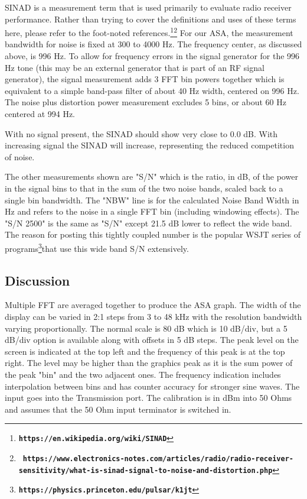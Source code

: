 SINAD is a measurement term that is used primarily to evaluate radio receiver performance.  Rather than trying to cover the definitions and uses of these terms here, please refer to the foot-noted references.\footnote{\textbf{\texttt{https://en.wikipedia.org/wiki/SINAD}}}\footnote{{\scriptsize\ \textbf{\texttt{https://www.electronics-notes.com/articles/radio/radio-receiver-sensitivity/what-is-sinad-signal-to-noise-and-distortion.php}}}}
%
For our ASA, the measurement bandwidth for noise is fixed at 300 to 4000 Hz.  The frequency center, as discussed above, is 996 Hz.  To allow for frequency errors in the signal generator for the 996 Hz tone (this may be an external generator that is part of an RF signal generator), the signal measurement adds 3 FFT bin powers together which is equivalent to a simple band-pass filter of about 40 Hz width, centered on 996 Hz.  The noise plus distortion power measurement excludes 5 bins, or about 60 Hz centered at 994 Hz.

With no signal present, the SINAD should show very close to 0.0 dB.  With increasing signal the SINAD will increase, representing the reduced competition of noise.

The other measurements shown are "\textsf{S/N}" which is the ratio, in dB, of the power in the signal bins to that in the sum of the two noise bands, scaled back to a single bin bandwidth.   The "\textsf{NBW}"  line is for the calculated Noise Band Width in Hz and refers to the noise in a single FFT bin (including windowing effects).   The "\textsf{S/N 2500}" is the same as "\textsf{S/N}" except 21.5 dB lower to reflect the wide band.  The reason for posting this tightly coupled number is the popular WSJT series of programs\footnote{\textbf{\texttt{https://physics.princeton.edu/pulsar/k1jt}}}that use this wide band S/N extensively.

\subsection{Discussion}
\label{subsect:ASADiscus}
Multiple FFT are averaged together to produce the ASA graph.  The width of the display can be varied in 2:1 steps from 3 to 48 kHz with the resolution bandwidth varying proportionally.  The normal scale is 80 dB which is 10 dB/div, but a 5 dB/div option is available along with offsets in 5 dB steps.  The peak level on the screen is indicated at the top left and the frequency of this peak is at the top right.  The level may be higher than the graphics peak as it is the sum power of the peak "bin" and the two adjacent ones.  The frequency indication includes interpolation between bins and has counter accuracy for stronger sine waves.  The input goes into the  Transmission port.  The calibration is in dBm into 50 Ohms and assumes that the 50 Ohm input terminator is switched in.
